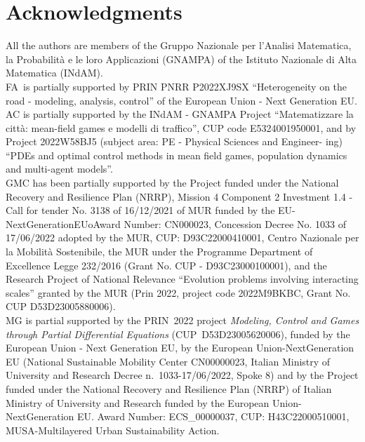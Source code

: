 \documentclass[a4paper, 10pt, final]{article}
\begin{document}
\section*{Acknowledgments}

All the authors are members of the Gruppo Nazionale per l'Analisi Matematica,
la Probabilità e le loro Applicazioni (GNAMPA)
of the Istituto Nazionale di Alta Matematica (INdAM).
\\
FA~is partially supported by PRIN PNRR P2022XJ9SX ``Heterogeneity on the road - modeling, analysis, control'' of the European Union - Next Generation EU.\\
AC is partially supported by the INdAM - GNAMPA Project “Matematizzare la citt\`a: mean-field games e modelli di traffico”, CUP code E5324001950001, and by Project 2022W58BJ5 (subject area: PE - Physical Sciences and Engineer-
ing) “PDEs and optimal control methods in mean field games, population dynamics and multi-agent models”.\\
 GMC has been partially
supported by the Project funded under the National Recovery and
Resilience Plan (NRRP), Mission 4 Component 2 Investment 1.4 -Call for
tender No. 3138 of 16/12/2021 of MUR funded by the
EU-NextGenerationEUoAward Number: CN000023, Concession Decree No. 1033
of 17/06/2022 adopted by the MUR, CUP: D93C22000410001, Centro
Nazionale per la Mobilit\`a Sostenibile, the MUR under the Programme
Department of Excellence Legge 232/2016 (Grant No. CUP -
D93C23000100001), and the Research Project of National Relevance
``Evolution problems involving interacting scales'' granted by the MUR
(Prin 2022, project code 2022M9BKBC, Grant No. CUP D53D23005880006).\\
MG is partial supported by the
PRIN~2022 project \emph{Modeling, Control and Games through Partial
  Differential Equations} (CUP~D53D23005620006), funded by the
European Union - Next Generation EU, by the
European Union-NextGeneration EU (National Sustainable Mobility Center
CN00000023, Italian Ministry of University and Research Decree
n.~1033-17/06/2022, Spoke 8) and by the Project funded under the
National Recovery and Resilience Plan (NRRP) of Italian Ministry of
University and Research funded by the European Union-NextGeneration
EU. Award Number: ECS\_00000037, CUP: H43C22000510001,
MUSA-Multilayered Urban Sustainability Action.
\end{document}
